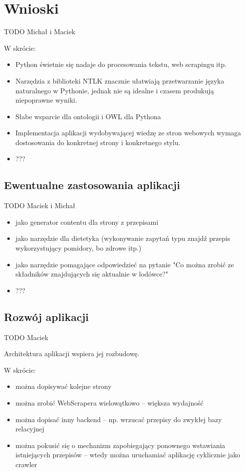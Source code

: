 \documentclass[11pt,a4paper]{article}
\begin{document}
\section{Wnioski}
TODO Michał i Maciek

W skrócie: %
\begin{itemize}
  \item Python świetnie się nadaje do procesowania tekstu, web scrapingu itp.
  \item Narzędzia z biblioteki NTLK znacznie ułatwiają przetwarzanie języka naturalnego w Pythonie, jednak nie są idealne i czasem produkują niepoprawne wyniki.
  \item Słabe wsparcie dla ontologii i OWL dla Pythona
  \item Implementacja aplikacji wydobywającej wiedzę ze stron webowych wymaga dostosowania do konkretnej strony i konkretnego stylu.
  \item ???
\end{itemize}

\subsection{Ewentualne zastosowania aplikacji}
TODO Maciek i Michał
\begin{itemize}
  \item jako generator contentu dla strony z przepisami
  \item jako narzędzie dla dietetyka (wykonywanie zapytań typu znajdź przepis wykorzystujący pomidory, bo zdrowe itp.)
  \item jako narzędzie pomagające odpowiedzieć na pytanie "Co można zrobić ze składników znajdujących się aktualnie w lodówce?"
  \item ???
\end{itemize}

\subsection{Rozwój aplikacji}
TODO Maciek

Architektura aplikacji wspiera jej rozbudowę.

W skrócie: %
\begin{itemize}
  \item można dopisywać kolejne strony
  \item można zrobić WebScrapera wielowątkowo -- większa wydajność
  \item można dopisać inny backend -- np. wrzucać przepisy do zwykłej bazy relacyjnej
  \item można pokusić się o mechanizm zapobiegający ponownego wstawiania istniejących przepisów -- wtedy można uruchamiać aplikację cyklicznie jako crawler
\end{itemize}
\end{document}
